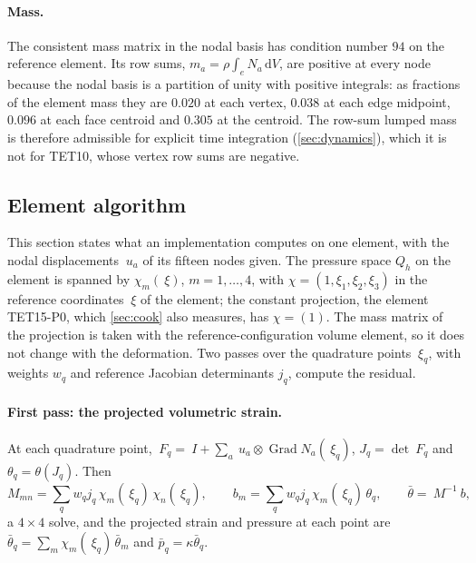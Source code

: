\documentclass{article}
\newcommand{\F}{~F}
\newcommand{\Id}{~I}
\newcommand{\Grad}{\operatorname{Grad}}
\newcommand{\diff}{\,\mathrm{d}}
\theoremstyle{definition}
\theoremstyle{plain}
\begin{document}
\paragraph{Mass.} The consistent mass matrix in the nodal basis has
condition number $94$ on the reference element. Its row sums, $m_a = \rho
\int_e N_a \diff V$, are positive at every node because the nodal basis is
a partition of unity with positive integrals: as fractions of the element
mass they are $0.020$ at each vertex, $0.038$ at each edge midpoint, $0.096$
at each face centroid and $0.305$ at the centroid. The row-sum lumped mass
is therefore admissible for explicit time integration (\cref{sec:dynamics}),
which it is not for TET10, whose vertex row sums are negative.

\subsection{Element algorithm}
\label{sec:algorithm}

This section states what an implementation computes on one element, with
the nodal displacements $~u_a$ of its fifteen nodes given. The pressure
space $Q_h$ on the element is spanned by $\chi_m(~\xi)$, $m = 1, \dots, 4$,
with $\chi = (1, \xi_1, \xi_2, \xi_3)$ in the reference coordinates
$~\xi$ of the element; the constant projection, the element TET15-P0, which \cref{sec:cook} also
measures, has $\chi = (1)$. The mass matrix of the projection is taken with
the reference-configuration volume element, so it does not change with the
deformation. Two passes over the quadrature points $~\xi_q$, with weights
$w_q$ and reference Jacobian determinants $j_q$, compute the residual.

\paragraph{First pass: the projected volumetric strain.} At each quadrature
point, $\F_q = \Id + \sum_a ~u_a \otimes \Grad N_a(~\xi_q)$, $J_q =
\det\F_q$ and $\theta_q = \theta(J_q)$. Then
\begin{equation}
  \label{eq:pass1}
  M_{mn} = \sum_q w_q j_q\, \chi_m(~\xi_q)\, \chi_n(~\xi_q),
  \qquad
  b_m = \sum_q w_q j_q\, \chi_m(~\xi_q)\, \theta_q,
  \qquad
  \bar\theta = ~M^{-1} ~b ,
\end{equation}
a $4 \times 4$ solve, and the projected strain and pressure at each point
are $\bar\theta_q = \sum_m \chi_m(~\xi_q)\,\bar\theta_m$ and $\bar p_q =
\kappa \bar\theta_q$.
\end{document}
